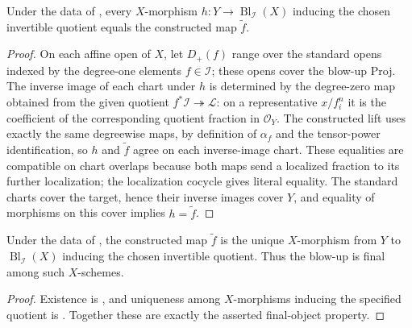 \begin{lemma}
  \label{lemma:nagata-blowup-universal-unique}

  Under the data of , every $X$-morphism
  $h\colon Y\to\operatorname{Bl}_{\mathcal I}(X)$ inducing the chosen
  invertible quotient equals the constructed map $\widetilde f$.
\end{lemma}

\begin{proof}
  On each affine open of $X$, let $D_+(f)$ range over the standard opens
  indexed by the degree-one elements $f\in\mathcal I$; these opens cover the
  blow-up Proj.  The inverse image of each chart
  under $h$ is determined by the degree-zero map obtained from the given
  quotient $f^*\mathcal I\twoheadrightarrow\mathcal L$: on a representative
  $x/f_i^n$ it is the coefficient of the corresponding quotient fraction in
  $\mathcal O_Y$.  The constructed lift uses exactly the same degreewise maps,
  by definition of $\alpha_f$ and the tensor-power identification, so $h$ and
  $\widetilde f$ agree on each inverse-image chart.  These equalities are
  compatible on chart overlaps because both maps send a localized fraction to
  its further localization; the localization cocycle gives literal equality.
  The standard charts cover the target, hence their inverse images cover $Y$,
  and equality of morphisms on this cover implies $h=\widetilde f$.
\end{proof}

\begin{theorem}
  \label{thm:nagata-blowup-universal-property}

  Under the data of , the constructed
  map $\widetilde f$ is the unique $X$-morphism from $Y$ to
  $\operatorname{Bl}_{\mathcal I}(X)$ inducing the chosen invertible
  quotient.  Thus the blow-up is final among such $X$-schemes.
\end{theorem}

\begin{proof}
  Existence is , and uniqueness
  among $X$-morphisms inducing the specified quotient is
  .  Together these are exactly the
  asserted final-object property.
\end{proof}

